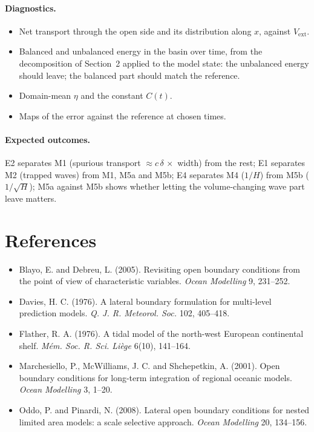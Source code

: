 \documentclass[11pt]{article}
\newcommand{\ext}{\mathrm{ext}}
\begin{document}
\paragraph{Diagnostics.}
\begin{itemize}
  \item Net transport through the open side and its distribution along $x$, against $V_\ext$.
  \item Balanced and unbalanced energy in the basin over time, from the decomposition of Section~2 applied to the
        model state: the unbalanced energy should leave; the balanced part should match the reference.
  \item Domain-mean $\eta$ and the constant $C(t)$.
  \item Maps of the error against the reference at chosen times.
\end{itemize}

\paragraph{Expected outcomes.}
E2 separates M1 (spurious transport $\approx c\,\delta\,\times$ width) from the rest; E1 separates M2 (trapped
waves) from M1, M5a and M5b; E4 separates M4 ($1/H$) from M5b ($1/\sqrt H$); M5a against M5b shows whether letting
the volume-changing wave part leave matters.

\section*{References}
\begin{itemize}
  \item Blayo, E. and Debreu, L. (2005). Revisiting open boundary conditions from the point of view of
        characteristic variables. \emph{Ocean Modelling} 9, 231--252.
  \item Davies, H. C. (1976). A lateral boundary formulation for multi-level prediction models.
        \emph{Q. J. R. Meteorol. Soc.} 102, 405--418.
  \item Flather, R. A. (1976). A tidal model of the north-west European continental shelf.
        \emph{Mém. Soc. R. Sci. Liège} 6(10), 141--164.
  \item Marchesiello, P., McWilliams, J. C. and Shchepetkin, A. (2001). Open boundary conditions for long-term
        integration of regional oceanic models. \emph{Ocean Modelling} 3, 1--20.
  \item Oddo, P. and Pinardi, N. (2008). Lateral open boundary conditions for nested limited area models: a scale
        selective approach. \emph{Ocean Modelling} 20, 134--156.
\end{itemize}
\end{document}

